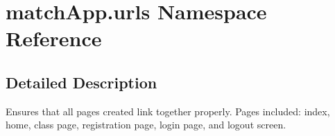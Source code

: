 \section{match\+App.\+urls Namespace Reference}
\label{namespacematch_app_1_1urls}


\subsection{Detailed Description}
\begin{DoxyVerb}Ensures that all pages created link together properly.
Pages included: index, home, class page, registration page, login page, and logout screen. 
\end{DoxyVerb}
 